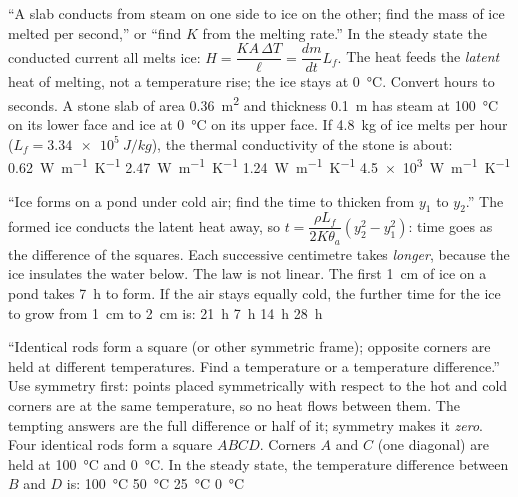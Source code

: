 {``A slab conducts from steam on one side to ice on the other; find the mass of ice melted per second,''
or ``find $K$ from the melting rate.''}
{In the steady state the conducted current all melts ice: $H=\dfrac{KA\,\Delta T}{\ell}=\dfrac{dm}{dt}L_f$.}
{The heat feeds the \emph{latent} heat of melting, not a temperature rise; the ice stays at
\SI{0}{\celsius}. Convert hours to seconds.}
{A stone slab of area \SI{0.36}{m^2} and thickness \SI{0.1}{m} has steam at \SI{100}{\celsius} on its
lower face and ice at \SI{0}{\celsius} on its upper face. If \SI{4.8}{kg} of ice melts per hour ($L_f=\SI{3.34e5}{J/kg}$), the thermal conductivity of the stone is about:}
{\SI{0.62}{W.m^{-1}.K^{-1}}}
{\SI{2.47}{W.m^{-1}.K^{-1}}}
{\SI{1.24}{W.m^{-1}.K^{-1}}}
{\SI{4.5e3}{W.m^{-1}.K^{-1}}}

{``Ice forms on a pond under cold air; find the time to thicken from $y_1$ to $y_2$.''}
{The formed ice conducts the latent heat away, so $t=\dfrac{\rho L_f}{2K\theta_a}(y_2^2-y_1^2)$: time
goes as the difference of the squares.}
{Each successive centimetre takes \emph{longer}, because the ice insulates the water below. The law is
not linear.}
{The first \SI{1}{cm} of ice on a pond takes \SI{7}{h} to form. If the air stays equally cold, the
further time for the ice to grow from \SI{1}{cm} to \SI{2}{cm} is:}
{\SI{21}{h}}
{\SI{7}{h}}
{\SI{14}{h}}
{\SI{28}{h}}

{``Identical rods form a square (or other symmetric frame); opposite corners are held at different
temperatures. Find a temperature or a temperature difference.''}
{Use symmetry first: points placed symmetrically with respect to the hot and cold corners are at the
same temperature, so no heat flows between them.}
{The tempting answers are the full difference or half of it; symmetry makes it \emph{zero}.}
{Four identical rods form a square $ABCD$. Corners $A$ and $C$ (one diagonal) are held at
\SI{100}{\celsius} and \SI{0}{\celsius}. In the steady state, the temperature difference between $B$
and $D$ is:}
{\SI{100}{\celsius}}
{\SI{50}{\celsius}}
{\SI{25}{\celsius}}
{\SI{0}{\celsius}}

